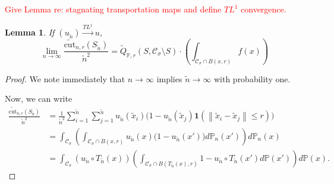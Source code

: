 \documentclass{article}
\newcommand{\norm}[1]{\left\lVert#1\right\rVert}
\newcommand{\1}{\mathbf{1}}
\newcommand{\cut}{\mathrm{cut}}
\newcommand{\Pbb}{\mathbb{P}}
\newcommand{\Cset}{\mathcal{C}}
\newcommand{\Csig}{\Cset_{\sigma}}
\newcommand{\wn}{\widetilde{n}}
\newcommand{\wx}{\widetilde{x}}
\theoremstyle{aldenthm}
\newtheorem{lemma}{Lemma}
\begin{document}
\textcolor{red}{Give Lemma re: stagnating transportation maps and define $TL^1$ convergence.}
\begin{lemma}
	If $(u_{\wn}) \overset{TL^1}{\to} u$,
	\begin{equation*}
	\lim_{n \to \infty} \frac{\widetilde{\cut}_{n,r}(S_{\wn})}{\wn^2} = \widetilde{Q}_{\Pbb,r}(S, \Csig \setminus S) \cdot \left(\int_{\Csig \cap B(x,r)} f(x) \right)
	\end{equation*}
\end{lemma}
\begin{proof}
	We note immediately that $n \to \infty$ implies $\wn \to \infty$ with probability one.
	
	Now, we can write
	\begin{align*}
	 \frac{\widetilde{\cut}_{n,r}(S_{\wn})}{\wn^2} & = \frac{1}{\wn^2} \sum_{i = 1}^{\wn} \sum_{j = 1}^{\wn} u_{\wn}(\wx_i) \bigl( 1 - u_{\wn}(\wx_j) \1(\norm{\wx_i - \wx_j} \leq r) \bigr)  \\
	& = \int_{\Csig} \left(\int_{\Csig \cap B(x,r)} u_{\wn}(x) \bigl( 1 - u_{\wn}(x') \bigr) d\Pbb_n(x') \right) d\Pbb_n(x) \\
	& = \int_{\Csig} \left(u_{\wn} \circ T_{\wn}(x)\right) \left(\int_{\Csig \cap B(T_{\wn}(x),r)}  1 - u_{\wn} \circ T_{\wn}(x') d\Pbb(x') \right) d\Pbb(x).
	\end{align*}
	

\end{proof}
\end{document}
